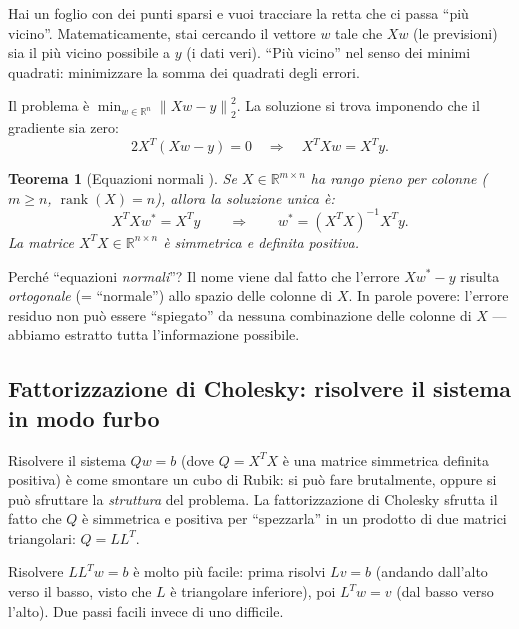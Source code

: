 \documentclass[a4paper,11pt]{article}
\newtheorem{theorem}{Teorema}[section]
\theoremstyle{definition}
\newcommand{\R}{\mathbb{R}}
\newcommand{\norm}[1]{\left\lVert #1 \right\rVert}
\DeclareMathOperator{\rank}{rank}
\begin{document}
\begin{analogia}
Hai un foglio con dei punti sparsi e vuoi tracciare la retta che ci passa ``più vicino''. Matematicamente, stai cercando il vettore $w$ tale che $Xw$ (le previsioni) sia il più vicino possibile a $y$ (i dati veri). ``Più vicino'' nel senso dei minimi quadrati: minimizzare la somma dei quadrati degli errori.
\end{analogia}

Il problema è $\min_{w \in \R^n} \norm{Xw - y}_2^2$. La soluzione si trova imponendo che il gradiente sia zero:
\[
  2X^T(Xw - y) = 0 \quad\Longrightarrow\quad X^T X w = X^T y.
\]

\begin{theorem}[Equazioni normali {\cite[Lecture~4]{nla-slides}}]
Se $X \in \R^{m \times n}$ ha rango pieno per colonne ($m \geq n$, $\rank(X) = n$), allora la soluzione unica è:
\[
  X^T X w^* = X^T y \qquad\Longrightarrow\qquad w^* = (X^TX)^{-1}X^Ty.
\]
La matrice $X^TX \in \R^{n \times n}$ è simmetrica e definita positiva.
\end{theorem}

\begin{intuizione}
Perché ``equazioni \emph{normali}''? Il nome viene dal fatto che l'errore $Xw^* - y$ risulta \emph{ortogonale} (= ``normale'') allo spazio delle colonne di $X$. In parole povere: l'errore residuo non può essere ``spiegato'' da nessuna combinazione delle colonne di $X$ --- abbiamo estratto tutta l'informazione possibile.
\end{intuizione}

\subsection{Fattorizzazione di Cholesky: risolvere il sistema in modo furbo}
\label{subsec:cholesky}

\begin{analogia}
Risolvere il sistema $Qw = b$ (dove $Q = X^TX$ è una matrice simmetrica definita positiva) è come smontare un cubo di Rubik: si può fare brutalmente, oppure si può sfruttare la \emph{struttura} del problema. La fattorizzazione di Cholesky sfrutta il fatto che $Q$ è simmetrica e positiva per ``spezzarla'' in un prodotto di due matrici triangolari: $Q = LL^T$.

Risolvere $LL^Tw = b$ è molto più facile: prima risolvi $Lv = b$ (andando dall'alto verso il basso, visto che $L$ è triangolare inferiore), poi $L^Tw = v$ (dal basso verso l'alto). Due passi facili invece di uno difficile.
\end{analogia}
\end{document}
